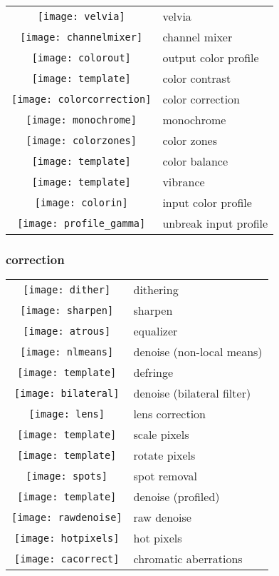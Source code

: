 \documentclass[\ArgLang,\ArgFormat,9pt]{extarticle}
\begin{document}
\begin{multicols}{3}
  \colorbox{keycol}{%
    \begin{tabularx}{\tabwidth}{cl} 
      \texttt{[image: velvia]} & velvia \\
      \texttt{[image: channelmixer]} & channel mixer \\
      \texttt{[image: colorout]} & output color profile \\
      \texttt{[image: template]} & color contrast \\
      \texttt{[image: colorcorrection]} & color correction \\
      \texttt{[image: monochrome]} & monochrome \\
      \texttt{[image: colorzones]} & color zones \\
      \texttt{[image: template]} & color balance \\
      \texttt{[image: template]} & vibrance \\
      \texttt{[image: colorin]} & input color profile \\
      \texttt{[image: profile\_gamma]} & unbreak input profile \\
    \end{tabularx}}

  \subsubsection{correction}

  \colorbox{keycol}{%
    \begin{tabularx}{\tabwidth}{cl} 
      \texttt{[image: dither]} & dithering \\
      \texttt{[image: sharpen]} & sharpen \\
      \texttt{[image: atrous]} & equalizer \\
      \texttt{[image: nlmeans]} & denoise (non-local means) \\
      \texttt{[image: template]} & defringe \\
      \texttt{[image: bilateral]} & denoise (bilateral filter) \\
      \texttt{[image: lens]} & lens correction \\
      \texttt{[image: template]} & scale pixels \\
      \texttt{[image: template]} & rotate pixels \\
      \texttt{[image: spots]} & spot removal \\
      \texttt{[image: template]} & denoise (profiled) \\
      \texttt{[image: rawdenoise]} & raw denoise \\
      \texttt{[image: hotpixels]} & hot pixels \\
      \texttt{[image: cacorrect]} & chromatic aberrations \\
    \end{tabularx}}


\end{multicols}
\end{document}
